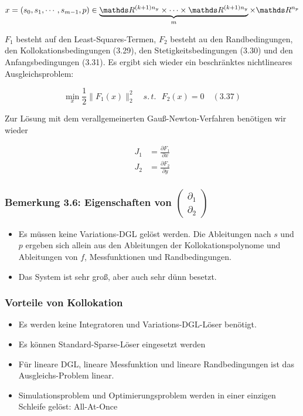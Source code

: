 \begin{align*}
x &= (s_0,s_1,\cdots,s_{m-1},p) \in \underbrace{ \R^{(k+1)n_y} \times \cdots \times \R^{(k+1)n_y}}_{m} \times \R^{n_p} \\
\end{align*}

$F_1$ besteht auf den Least-Squares-Termen, $F_2$ besteht au den Randbedingungen, den Kollokationsbedingungen (3.29), den Stetigkeitsbedingungen (3.30) und den Anfangsbedingungen (3.31). Es ergibt sich wieder ein beschränktes nichtlineares Ausgleichsproblem:

\[ \min_x \frac 12 \| F_1(x) \|_2^2 \quad s.\,t. \text{ } F_2(x) = 0 \quad (3.37) \]

Zur Lösung mit dem verallgemeinerten Gauß-Newton-Verfahren benötigen wir wieder

\begin{align*}
J_1 &= \frac{\partial F_1}{\partial x} \\
J_2 &= \frac{\partial F_2}{\partial y}
\end{align*}


\subsubsection*{Bemerkung 3.6: Eigenschaften von $\begin{pmatrix} \partial_1 \\ \partial_2 \end{pmatrix}$}

\begin{itemize}
\item Es müssen keine Variations-DGL gelöst werden. Die Ableitungen nach $s$ und $p$ ergeben sich allein aus den Ableitungen der Kollokationspolynome und Ableitungen von $f$, Messfunktionen und Randbedingungen.
\item Das System ist sehr groß, aber auch sehr dünn besetzt.
\end{itemize}

\subsubsection*{Vorteile von Kollokation}

\begin{itemize}
\item Es werden keine Integratoren und Variations-DGL-Löser benötigt.
\item Es können Standard-Sparse-Löser eingesetzt werden
\item Für lineare DGL, lineare Messfunktion und lineare Randbedingungen ist das Ausgleichs-Problem linear.
\item Simulationsproblem und Optimierungsproblem werden in einer einzigen Schleife gelöst: All-At-Once
\end{itemize}


